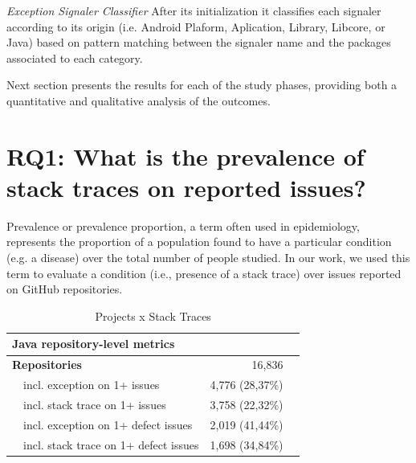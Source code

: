 \documentclass[conference]{IEEEtran}
\begin{document}
\noindent\emph{Exception Signaler Classifier} After its initialization it
classifies each signaler according to its origin (i.e. Android Plaform,
Aplication, Library, Libcore, or Java) based on pattern matching between the
signaler name and the packages associated to each category.

Next section presents the results for each of the study phases, providing both a
quantitative and qualitative analysis of the outcomes.


\section{RQ1: What is the prevalence of stack traces on reported issues?}

Prevalence or prevalence proportion, a term often used in epidemiology,
represents the proportion of a population found to have a particular condition
(e.g. a disease) over the total number of people studied. In our work, we used
this term to evaluate a condition (i.e., presence of a stack trace) over issues
reported on GitHub repositories.



\begin{table}
\centering
\begin{tabular}{p{1em}lrr}
\hline
 \multicolumn{2}{l}{\bfseries{Java repository-level metrics}} & \\
\hline
\multicolumn{2}{l}{\bfseries{Repositories}} & 16,836\\
    & incl. exception on 1+ issues & 4,776 (28,37\%) \\
    & incl. stack trace on 1+ issues & 3,758 (22,32\%) \\
    & incl. exception on 1+ defect issues & 2,019 (41,44\%)\\
    & incl. stack trace on 1+ defect issues  & 1,698 (34,84\%) \\

\hline
\end{tabular}
\caption{Projects x Stack Traces}
\label{tab:proj}
\end{table}
\end{document}
